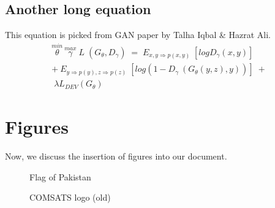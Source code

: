 \documentclass[12pt]{article}
\begin{document}
\subsection{Another long equation}
This equation is picked from GAN paper by Talha Iqbal \& Hazrat Ali.
\begin{equation}
\begin{split}
\stackrel{min}{\theta}\ \stackrel{max}{\gamma} \;L\;(G_{\theta}, D_{\gamma}) \;= \;E_{x,y \Rightarrow p(x,y)} \;[log D_{\gamma}(x,y)] \;\\+ \:E_{y\Rightarrow p(y),z \Rightarrow p(z)} \;[log(1 - D_{\gamma}\:(G_{\theta}(y,z),y))] \;+\\ \;\lambda L_{DEV}(G_{\theta})
\end{split}
\end{equation}

\section{Figures}
Now, we discuss the insertion of figures into our document.
\begin{figure}[ht!]
\centering
{} %
\caption{Flag of Pakistan}
\label{fig:pakflag}
\end{figure}

\begin{figure}[ht!]
\centering
{} %
\caption{COMSATS logo (old)}
\label{fig:comsatslogo}
\end{figure}
%
\end{document}
